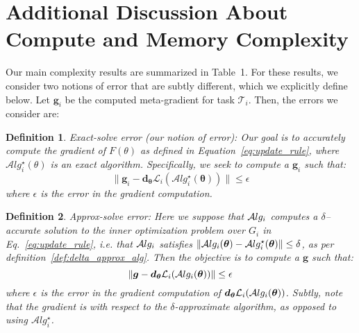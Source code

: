 \documentclass{article} \usepackage[nonatbib, final]{mod_neurips}
\newcommand{\task}{\mathcal{T}}
\newtheorem{definition}{Definition}
\newcommand{\prior}{{\bm{\theta}}}               \newcommand{\priorspace}{\Theta}
\newcommand{\fn}{\mathcal{L}}                  \newcommand{\udfn}{\tilde{\fn}}        \newcommand{\fnht}{\hat{\fn}}        \newcommand{\ud}{\alg}
\newcommand{\algstar}{\mathcal{A}lg^\star}
\newcommand{\eps}{\epsilon}
\newcommand{\grad}{\bm{d}}
\begin{document}
\section{Additional Discussion About Compute and Memory Complexity}
\label{sec:compute_memory_discussion}

Our main complexity results are summarized in Table~1. For these results, we consider two notions of error that are subtly different, which we explicitly define below. Let $\bm{g}_i$ be the computed meta-gradient for task $\task_i$. Then, the errors we consider are:

\begin{definition}
\label{def:exact_error}
Exact-solve error (our notion of error): Our goal
is to accurately compute the
gradient of $F(\theta)$ as defined in Equation~\ref {eq:update_rule},
where $\algstar_i(\theta)$ is an exact algorithm. Specifically, we seek to compute a $\bm{g}_i$ such that:
\[
\| \bm{g}_i - \grad_\prior \fn_i(\algstar_i(\prior)) \| \leq \eps
\]
where $\eps$ is the error in the gradient computation.
\end{definition}

\begin{definition}
\label{def:approx_error}
Approx-solve error: Here we suppose that $\mathcal{A}lg_i$ computes a $\delta$--accurate solution to the inner optimization problem over $G_i$ in Eq.~\ref{eq:update_rule}, i.e. that $\mathcal{A}lg_i$ satisfies $\| \alg_i(\prior) - \algstar_i(\prior) \| \leq \delta$, as per definition~\ref{def:delta_approx_alg}. Then the objective is to compute a $\bm{g}$ such that:
\[
\| \bm{g} - \grad_\prior \fn_i(\alg_i(\prior)) \| \leq \eps
\]
where $\eps$ is the error in the gradient computation of $\grad_\prior \fn_i(\alg_i(\prior))$. Subtly, note that the gradient is with respect to the $\delta$-approximate algorithm, as opposed to using $\algstar_i$.
\end{definition}
\end{document}
